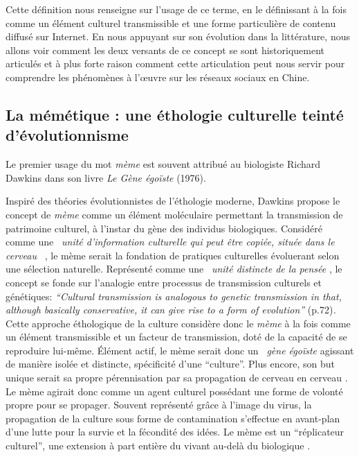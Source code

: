  Cette définition nous renseigne sur l{\textquoteright}usage de ce terme, en le définissant à la fois comme un élément culturel transmissible et une forme particulière de contenu diffusé sur Internet. En nous appuyant sur son évolution dans la littérature, nous allons voir comment les deux versants de ce concept se sont historiquement articulés et à plus forte raison comment cette articulation peut nous servir pour comprendre les phénomènes à l{\textquoteright}{\oe}uvre sur les réseaux sociaux en Chine. 

\subsection[La mémétique : une éthologie culturelle teinté d'évolutionnisme]{La mémétique : une éthologie culturelle teinté d{\textquoteright}évolutionnisme}

Le premier usage du mot \textit{mème} est souvent attribué au biologiste Richard Dawkins dans son livre \textit{Le Gène égo\"iste }(1976).

Inspiré des théories évolutionnistes de l{\textquoteright}éthologie moderne, Dawkins propose le concept de \textit{mème} comme un élément moléculaire permettant la transmission de patrimoine culturel, à l'instar du gène des individus biologiques. Considéré comme une \textit{{\guillemotleft}~unité d{\textquoteright}information culturelle qui peut être copiée, située dans le cerveau~{\guillemotright}} \citep{Blackmore2001}, le mème serait la fondation de pratiques culturelles évoluerant selon une sélection naturelle. Représenté comme une {\guillemotleft}~\textit{unité distincte de la pensée {\guillemotright}} \citep{Dawkins1989}, le concept se fonde sur l{\textquoteright}analogie entre processus de transmission culturels et génétiques: \textit{{\textquotedblleft}Cultural transmission is analogous to genetic transmission in that, although basically conservative, it can give rise to a form of evolution{\textquotedblright} }(p.72)\textit{.} Cette approche éthologique de la culture considère donc le \textit{mème} à la fois comme un élément transmissible et un facteur de transmission, doté de la capacité de se reproduire lui-même. \'Elément actif, le mème serait donc un \textit{{\guillemotleft}~gène égo\"iste {\guillemotright} }agissant de manière isolée et distincte, spécificité d{\textquoteright}une {\textquotedblleft}culture{\textquotedblright}. Plus encore, son but unique serait sa propre pérennisation par sa propagation de cerveau en cerveau \citep{Blackmore1997}. Le mème agirait donc comme un agent culturel possédant une forme de volonté propre pour se propager. Souvent représenté gr\^ace à l{\textquoteright}image du virus, la propagation de la culture sous forme de contamination s'effectue en avant-plan d'une lutte pour la survie et la fécondité des idées. Le mème est un {\textquotedblleft}réplicateur culturel{\textquotedblright}, une extension à part entière du vivant au-delà du biologique \citep{Bloom2000}. 

